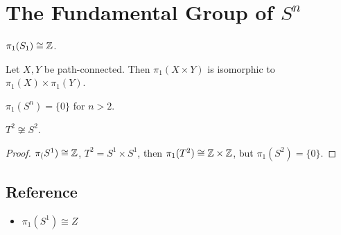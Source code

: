 \chapter{The Fundamental Group of $S^n$}\label{chp:4_3}


\begin{proposition}{}{}
    $\pi_1(S_1)\cong\mathbb{Z}$.
\end{proposition}

\begin{proposition}{}{}
    Let $X, Y$ be path-connected. Then $\pi_1(X \times Y )$ is isomorphic to $\pi_1(X) \times \pi_1(Y)$.
\end{proposition}

\begin{proposition}{}{}
    $\pi_1(S^n) = \{0\}$ for $n > 2$.
\end{proposition}

\begin{proposition}{}{}
    $T^2\not\cong S^2$.
\end{proposition}
\begin{proof}
    $\pi_(S^1)\cong \mathbb{Z}$, $T^2=S^1\times S^1$, then $\pi_1(T^2)\cong \mathbb{Z}\times \mathbb{Z}$, but $\pi_1(S^2)=\{0\}$.
\end{proof}

\section{Reference}

\begin{itemize}
    \item \href{https://www.math.toronto.edu/mgualt/MAT1300/Week%202%20Term%202.pdf}{$\pi_1(S^1)\cong Z$}
\end{itemize}